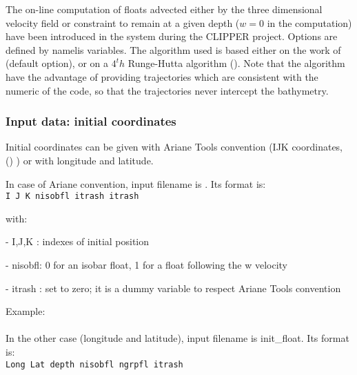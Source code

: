 \documentclass[../tex_main/NEMO_manual]{subfiles}
\begin{document}

The on-line computation of floats advected either by the three dimensional velocity field or 
constraint to remain at a given depth ($w = 0$ in the computation) have been introduced in 
the system during the CLIPPER project.
Options are defined by  namelis variables.
The algorithm used is based either on the work of \cite{Blanke_Raynaud_JPO97} (default option), or 
on a $4^th$ Runge-Hutta algorithm ().
Note that the \cite{Blanke_Raynaud_JPO97} algorithm have the advantage of providing trajectories which 
are consistent with the numeric of the code, so that the trajectories never intercept the bathymetry.

\subsubsection{Input data: initial coordinates}

Initial coordinates can be given with Ariane Tools convention (IJK coordinates,
() ) or with longitude and latitude.

In case of Ariane convention, input filename is .
Its format is: \\
{\scriptsize \texttt{I J K nisobfl itrash itrash}}

\noindent with:

 - I,J,K  : indexes of initial position

 - nisobfl: 0 for an isobar float, 1 for a float following the w velocity  

 - itrash : set to zero; it is a dummy variable to respect Ariane Tools convention

\noindent Example: \\
 \\

In the other case (longitude and latitude), input filename is init\_float.
Its format is: \\
{\scriptsize \texttt{Long Lat depth nisobfl ngrpfl itrash}}
\end{document}
